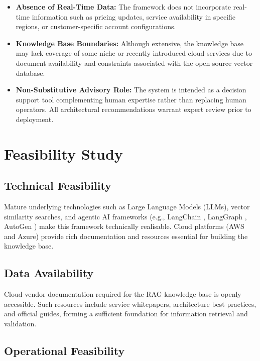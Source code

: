\begin{itemize}
    \item \textbf{Absence of Real-Time Data:} The framework does not incorporate real-time information such as pricing updates, service availability in specific regions, or customer-specific account configurations.
    \item \textbf{Knowledge Base Boundaries:} Although extensive, the knowledge base may lack coverage of some niche or recently introduced cloud services due to document availability and constraints associated with the open source vector database.
    \item \textbf{Non-Substitutive Advisory Role:} The system is intended as a decision support tool complementing human expertise rather than replacing human operators. All architectural recommendations warrant expert review prior to deployment.
\end{itemize}

\section{Feasibility Study}

\subsection{Technical Feasibility}

Mature underlying technologies such as Large Language Models (LLMs), vector similarity searches, and agentic AI frameworks (e.g., LangChain \cite{langchain2024docs}, LangGraph \cite{langgraph2024docs}, AutoGen \cite{wu2023autogen}) make this framework technically realisable. Cloud platforms (AWS and Azure) provide rich documentation and resources essential for building the knowledge base.

\subsection{Data Availability}

Cloud vendor documentation required for the RAG knowledge base is openly accessible. Such resources include service whitepapers, architecture best practices, and official guides, forming a sufficient foundation for information retrieval and validation. %

\subsection{Operational Feasibility}


